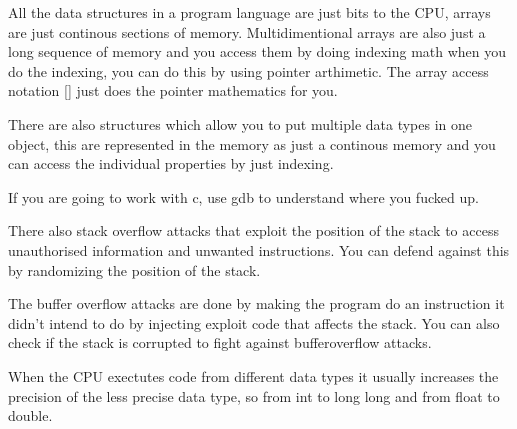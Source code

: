 \documentclass{article}
\begin{document}
All the data structures in a program language are just bits to the CPU, arrays are just continous sections of memory. Multidimentional arrays are also just a long sequence of memory and 
you access them by doing indexing math when you do the indexing, you can do this by using pointer arthimetic. The array access notation [] just does the pointer mathematics for you.

There are also structures which allow you to put multiple data types in one object, this are represented in the memory as just a continous memory and you can access the individual properties by just indexing.

If you are going to work with c, use gdb to understand where you fucked up.

There also stack overflow attacks that exploit the position of the stack to access unauthorised information and unwanted instructions. You can defend against this by randomizing the position of the stack.

The buffer overflow attacks are done by making the program do an instruction it didn't intend to do by injecting exploit code that affects the stack. You can also check if the stack is corrupted to fight against bufferoverflow attacks.

When the CPU exectutes code from different data types it usually increases the precision of the less precise data type, so from int to long long and from float to double. 
\end{document}
